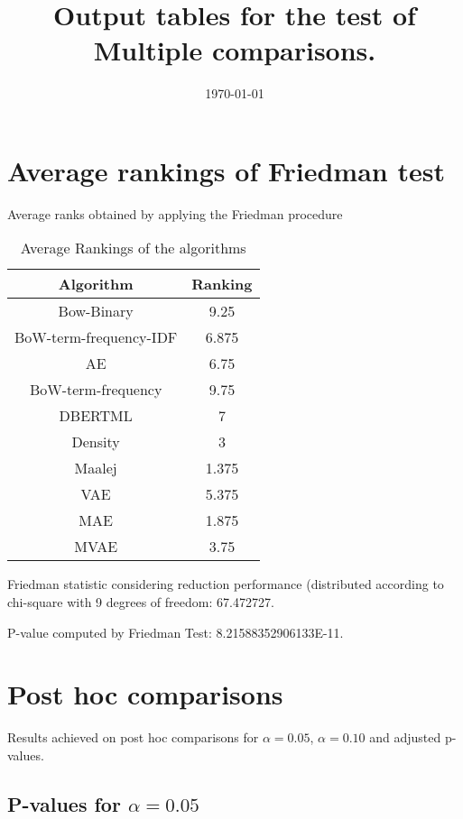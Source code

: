 \documentclass[a4paper,10pt]{article}
\title{Output tables for the test of Multiple comparisons.}
\author{}
\date{\today}
\begin{document}
\begin{landscape}
\pagestyle{empty}
\maketitle
\thispagestyle{empty}
\section{Average rankings of Friedman test}



Average ranks obtained by applying the Friedman procedure

\begin{table}[!htp]
\centering
\begin{tabular}{|c|c|}\hline
Algorithm&Ranking\\\hline
Bow-Binary & 9.25\\
BoW-term-frequency-IDF & 6.875\\
AE & 6.75\\
BoW-term-frequency & 9.75\\
DBERTML & 7\\
Density & 3\\
Maalej & 1.375\\
VAE & 5.375\\
MAE & 1.875\\
MVAE & 3.75\\
\hline
\end{tabular}
\caption{Average Rankings of the algorithms}
\end{table}

Friedman statistic considering reduction performance (distributed according to chi-square with 9 degrees of freedom: 67.472727.

P-value computed by Friedman Test: 8.21588352906133E-11.\newline



\pagebreak

\section{Post hoc comparisons}

Results achieved on post hoc comparisons for $\alpha = 0.05$, $\alpha = 0.10$ and adjusted p-values.

\subsection{P-values for $\alpha=0.05$}


\end{landscape}
\end{document}

